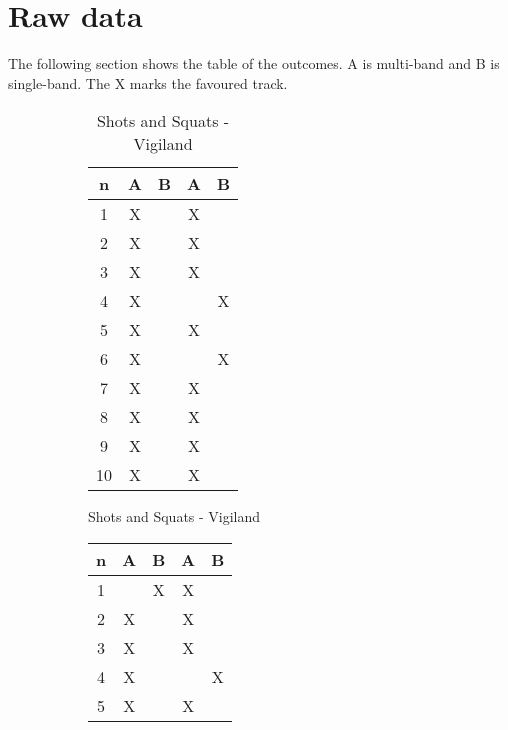 \section{Raw data}\label{sec:rawdata_listning}
The following section shows the table of the outcomes. A is multi-band and B is single-band. The X marks the favoured track. 
\begin{figure}[H]
\centering
\begin{subfigure}[t]{0.20\textwidth}
\begin{table}[H]
\centering
\begin{tabular}{ccccc}
n        & A       & B       & A       & B      \\ \bottomrule 
1        & X       &         & X       &        \\
2        & X       &         & X       &        \\
3        & X       &         & X       &        \\
4        & X       &         &         & X      \\
5        & X       &         & X       &        \\ \hline
6        & X       &         &         & X      \\
7        & X       &         & X       &        \\
8        & X       &         & X       &        \\
9        & X       &         & X       &        \\
10       & X       &         & X       &        \\ \bottomrule 
\end{tabular}
\caption{Shots and Squats - Vigiland}
\label{tab:shotsandsquats}
\end{table}
\end{subfigure}
\hfill
\begin{subfigure}[t]{0.20\textwidth}
\begin{table}[H]
\centering
\begin{tabular}{ccccc}
n         & A        & B        & A       & B       \\ \bottomrule 
1         &          & X        & X       &         \\
2         & X        &          & X       &         \\
3         & X        &          & X       &         \\
4         & X        &          &         & X       \\
5         & X        &          & X       &         \\ \hline

\end{tabular}
\end{table}
\end{subfigure}
\end{figure}
